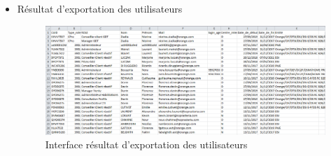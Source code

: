 \begin{itemize}
	\item Résultat d'exportation des utilisateurs
	\begin{figure}[H]
		\centering
		\includegraphics[width=0.65\linewidth]{img/screenshots/users/export}
		\caption[Interface résultat d'exportation des utilisateurs]{Interface résultat d'exportation des utilisateurs}
		\label{fig:export-user-ihm}
	\end{figure}
\end{itemize}

